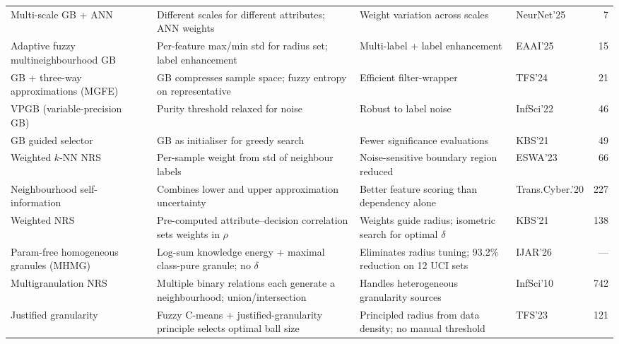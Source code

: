 \begin{table}[pos=!htbp]
\begin{tabular}{p{4.0cm}p{5.6cm}p{4.2cm}p{1.4cm}r}
\addlinespace
Multi-scale GB + ANN~\cite{Zhang2025NN}
  & Different scales for different attributes; ANN weights
  & Weight variation across scales
  & NeurNet'25 & 7 \\
\addlinespace
Adaptive fuzzy multineighbourhood GB~\cite{Sun2025EAAI}
  & Per-feature max/min std for radius set; label enhancement
  & Multi-label + label enhancement
  & EAAI'25 & 15 \\
\addlinespace
GB + three-way approximations (MGFE)~\cite{XiaDeyou2024TFS}
  & GB compresses sample space; fuzzy entropy on representative
  & Efficient filter-wrapper
  & TFS'24 & 21 \\
\addlinespace
VPGB (variable-precision GB)~\cite{Peng2022VPGB}
  & Purity threshold relaxed for noise
  & Robust to label noise
  & InfSci'22 & 46 \\
\addlinespace
GB guided selector~\cite{Xia2021KBSselector}
  & GB as initialiser for greedy search
  & Fewer significance evaluations
  & KBS'21 & 49 \\
\addlinespace
Weighted $k$-NN NRS~\cite{Wang2023ESWA}
  & Per-sample weight from std of neighbour labels
  & Noise-sensitive boundary region reduced
  & ESWA'23 & 66 \\
\addlinespace
Neighbourhood self-information~\cite{Wang2020selfinfo}
  & Combines lower and upper approximation uncertainty
  & Better feature scoring than dependency alone
  & Trans.Cyber.'20 & 227 \\
\addlinespace
Weighted NRS~\cite{Hu2021WNRS}
  & Pre-computed attribute--decision correlation sets weights in $\rho$
  & Weights guide radius; isometric search for optimal $\delta$
  & KBS'21 & 138 \\
\addlinespace
Param-free homogeneous granules (MHMG)~\cite{Nguyen2026MHMG}
  & Log-sum knowledge energy + maximal class-pure granule; no $\delta$
  & Eliminates radius tuning; 93.2\% reduction on 12 UCI sets
  & IJAR'26 & --- \\
\addlinespace
Multigranulation NRS~\cite{QianLiangYaoDang2010MGRS,LinQianLi2012NMGRS}
  & Multiple binary relations each generate a neighbourhood; union/intersection
  & Handles heterogeneous granularity sources
  & InfSci'10 & 742 \\
\addlinespace
Justified granularity~\cite{Li2023TFS}
  & Fuzzy C-means + justified-granularity principle selects optimal ball size
  & Principled radius from data density; no manual threshold
  & TFS'23 & 121 \\
\bottomrule
\end{tabular}
\end{table}

